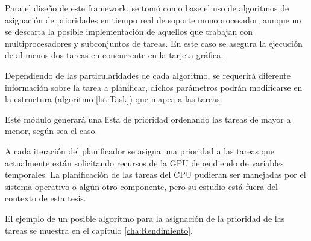 Para el diseño de este framework, se tomó como base el uso de algoritmos de asignación de prioridades en tiempo real de soporte monoprocesador, aunque no se descarta la posible implementación de aquellos que trabajan con multiprocesadores y subconjuntos de tareas. En este caso se asegura la ejecución de al menos dos tareas en concurrente en la tarjeta gráfica.
\newline

Dependiendo de las particularidades de cada algoritmo, se requerirá diferente información sobre la tarea a planificar, dichos parámetros podrán modificarse en la estructura (algoritmo \ref{lst:Task}) que mapea a las tareas.
\newline

Este módulo generará una lista de prioridad ordenando las tareas de mayor a menor, según sea el caso.
\newline

A cada iteración del planificador se asigna una prioridad a las tareas que actualmente están solicitando recursos de la GPU dependiendo de variables temporales. La planificación de las tareas del CPU pudieran ser manejadas por el sistema operativo o algún otro componente, pero su estudio está fuera del contexto de esta tesis.
\newline

El ejemplo de un posible algoritmo para la asignación de la prioridad de las tareas se muestra en el capítulo \ref{cha:Rendimiento}.